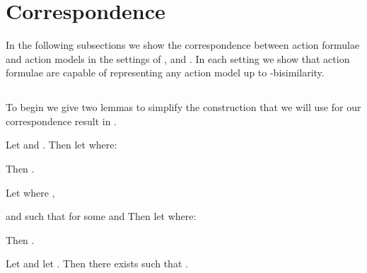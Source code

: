 \documentclass[twoside]{aiml14}
\begin{document}
  \section{Correspondence}\label{correspondence}

  In the following subsections we show the correspondence between action
  formulae and action models in the settings of \classK{}, \classKFF{} and
  \classS{}. In each setting we show that action formulae are capable of
  representing any action model up to -bisimilarity.

  \subsection{\classK{}}

  To begin we give two lemmas to simplify the construction that we will use
  for our correspondence result in \classK{}.

  \begin{lemma}\label{afl-k-construction-test}
      Let  and 
      .
      Then let  where:
      
      Then .
  \end{lemma}

  \begin{lemma}\label{afl-k-construction-learning}
      Let  where ,
       
      and  
      such that  
      for some  
      and  
      Then let  where:
      
      Then .
  \end{lemma}

  \begin{proposition}\label{afl-k-correspondence}
      Let  and 
      let . 
      Then there exists  such that 
      .
  \end{proposition}
\end{document}
